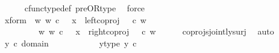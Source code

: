 \begin{isabellebody}
\ \ \ \ \isamarkupfalse%
\ cfunc{\isacharunderscore}{\kern0pt}type{\isacharunderscore}{\kern0pt}def\ pre{\isacharunderscore}{\kern0pt}OR{\isacharunderscore}{\kern0pt}type\ \isamarkupfalse%
\ force\isanewline
\ \ \isamarkupfalse%
\ \isamarkupfalse%
\ x{\isacharunderscore}{\kern0pt}form{\isacharcolon}{\kern0pt}\ {\isachardoublequoteopen}{\isacharparenleft}{\kern0pt}{\isasymexists}\ w{\isachardot}{\kern0pt}\ {\isacharparenleft}{\kern0pt}w\ {\isasymin}\isactrlsub c\ {\isasymone}\ {\isasymand}\ x\ {\isacharequal}{\kern0pt}\ {\isacharparenleft}{\kern0pt}left{\isacharunderscore}{\kern0pt}coproj\ {\isasymone}\ {\isacharparenleft}{\kern0pt}{\isasymone}{\isasymCoprod}{\isasymone}{\isacharparenright}{\kern0pt}{\isacharparenright}{\kern0pt}\ {\isasymcirc}\isactrlsub c\ w{\isacharparenright}{\kern0pt}{\isacharparenright}{\kern0pt}\isanewline
\ \ \ \ \ \ {\isasymor}\ \ {\isacharparenleft}{\kern0pt}{\isasymexists}\ w{\isachardot}{\kern0pt}\ {\isacharparenleft}{\kern0pt}w\ {\isasymin}\isactrlsub c\ {\isacharparenleft}{\kern0pt}{\isasymone}{\isasymCoprod}{\isasymone}{\isacharparenright}{\kern0pt}\ {\isasymand}\ x\ {\isacharequal}{\kern0pt}\ {\isacharparenleft}{\kern0pt}right{\isacharunderscore}{\kern0pt}coproj\ {\isasymone}\ {\isacharparenleft}{\kern0pt}{\isasymone}{\isasymCoprod}{\isasymone}{\isacharparenright}{\kern0pt}{\isacharparenright}{\kern0pt}\ {\isasymcirc}\isactrlsub c\ w{\isacharparenright}{\kern0pt}{\isacharparenright}{\kern0pt}{\isachardoublequoteclose}\isanewline
\ \ \ \ \isamarkupfalse%
\ coprojs{\isacharunderscore}{\kern0pt}jointly{\isacharunderscore}{\kern0pt}surj\ \isamarkupfalse%
\ auto\isanewline
\isanewline
\ \ \isamarkupfalse%
\ {\isachardoublequoteopen}y\ {\isasymin}\isactrlsub c\ domain\ {\isacharparenleft}{\kern0pt}{\isasymlangle}{\isasymt}{\isacharcomma}{\kern0pt}{\isasymt}{\isasymrangle}\ {\isasymamalg}\ {\isasymlangle}{\isasymt}{\isacharcomma}{\kern0pt}{\isasymf}{\isasymrangle}\ {\isasymamalg}\ {\isasymlangle}{\isasymf}{\isacharcomma}{\kern0pt}{\isasymt}{\isasymrangle}{\isacharparenright}{\kern0pt}{\isachardoublequoteclose}\ \isanewline
\ \ \isamarkupfalse%
\ \isamarkupfalse%
\ y{\isacharunderscore}{\kern0pt}type{\isacharcolon}{\kern0pt}\ {\isachardoublequoteopen}y\ {\isasymin}\isactrlsub c\ {\isacharparenleft}{\kern0pt}{\isasymone}{\isasymCoprod}{\isacharparenleft}{\kern0pt}{\isasymone}{\isasymCoprod}{\isasymone}{\isacharparenright}{\kern0pt}{\isacharparenright}{\kern0pt}{\isachardoublequoteclose}\ \ \isanewline

\end{isabellebody}
